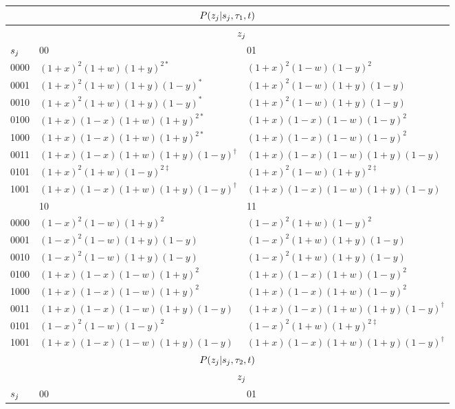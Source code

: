 \documentclass[a4paper]{article}
\begin{document}
\begin{table}
\centering
\begin{tabular}{|l|ll|}
\multicolumn{3}{c}{$P(z_j|s_j,\tau_1,t)$}\\
\hline
& \multicolumn{2}{|c|}{$z_j$}\\
    \hline
$s_j$    &00                              &01\\
    \hline
0000&$(1+x)^2   (1+w)(1+y)^{2*}$          &$(1+x)^2   (1-w)(1-y)^2$\\
0001&$(1+x)^2   (1+w)(1+y)(1-y)^*$        &$(1+x)^2   (1-w)(1+y)(1-y)$\\
0010&$(1+x)^2   (1+w)(1+y)(1-y)^*$        &$(1+x)^2   (1-w)(1+y)(1-y)$\\
0100&$(1+x)(1-x)(1+w)(1+y)^{2*}$          &$(1+x)(1-x)(1-w)(1-y)^2$\\
1000&$(1+x)(1-x)(1+w)(1+y)^{2*}$          &$(1+x)(1-x)(1-w)(1-y)^2$\\
0011&$(1+x)(1-x)(1+w)(1+y)(1-y)^{\dagger}$&$(1+x)(1-x)(1-w)(1+y)(1-y)$\\
0101&$(1+x)^2   (1+w)(1-y)^{2\ddagger}$   &$(1+x)^2   (1-w)(1+y)^{2\ddagger}$\\
1001&$(1+x)(1-x)(1+w)(1+y)(1-y)^{\dagger}$&$(1+x)(1-x)(1-w)(1+y)(1-y)$\\
    \hline
    \hline
&10                           &11\\
    \hline
0000&$(1-x)^2   (1-w)(1+y)^2$     &$(1-x)^2   (1+w)(1-y)^2$\\
0001&$(1-x)^2   (1-w)(1+y)(1-y)$  &$(1-x)^2   (1+w)(1+y)(1-y)$\\
0010&$(1-x)^2   (1-w)(1+y)(1-y)$  &$(1-x)^2   (1+w)(1+y)(1-y)$\\
0100&$(1+x)(1-x)(1-w)(1+y)^2$     &$(1+x)(1-x)(1+w)(1-y)^2$\\
1000&$(1+x)(1-x)(1-w)(1+y)^2$     &$(1+x)(1-x)(1+w)(1-y)^2$\\
0011&$(1+x)(1-x)(1-w)(1+y)(1-y)$  &$(1+x)(1-x)(1+w)(1+y)(1-y)^{\dagger}$\\
0101&$(1-x)^2   (1-w)(1-y)^2$     &$(1-x)^2   (1+w)(1+y)^{2\ddagger}$\\
1001&$(1+x)(1-x)(1-w)(1+y)(1-y)$  &$(1+x)(1-x)(1+w)(1+y)(1-y)^{\dagger}$\\
    \hline
    \multicolumn{3}{c}{$P(z_j|s_j,\tau_2,t)$}\\
\hline
& \multicolumn{2}{|c|}{$z_j$}\\
    \hline
$s_j$    &00                              &01\\

\end{tabular}
\end{table}
\end{document}
